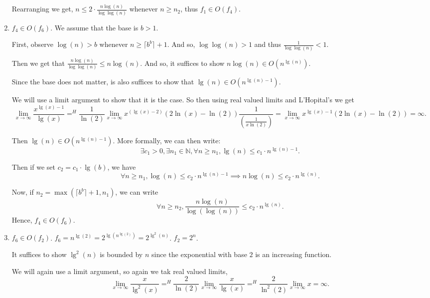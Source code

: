 \begin{soln}
\begin{enumerate}
		      Rearranging we get, \(n \leq 2 \cdot \frac{n\log(n)}{\log\log(n)}\) whenever \(n \geq n_2\), thus \(f_1 \in O(f_4)\).

		\item \(f_4 \in O(f_6)\). We assume that the base is \(b > 1\).

		      First, observe \(\log(n) > b\) whenever \(n \geq \lceil b^b \rceil + 1\). And so, \(\log\log(n) > 1\) and thus \(\frac{1}{\log\log(n)} < 1\).

		      Then we get that \(\frac{n\log(n)}{\log\log(n)} \leq n\log(n)\). And so, it suffices to show \(n\log(n) \in O(n^{\lg(n)})\).

		      Since the base does not matter, is also suffices to show that \(\lg(n) \in O(n^{\lg(n) - 1})\).

		      We will use a limit argument to show that it is the case. So then using real valued limits and L'Hopital's we get
		      \[
			      \lim_{x \to \infty} \frac{x^{\lg(x) - 1}}{\lg(x)} =^{H} \frac{1}{\ln(2)}\lim_{x \to \infty}x^{(\lg(x) - 2)}(2\ln(x) - \ln(2))\frac{1}{\left(\frac{1}{x\ln(2)}\right)} = \lim_{x \to \infty} x^{\lg(x) - 1}(2\ln(x) - \ln(2)) = \infty.
		      \]

		      Then \(\lg(n) \in O(n^{\lg(n) - 1})\). More formally, we can then write:
		      \[
			      \exists c_1 > 0, \exists n_1 \in \mathbb{N}, \forall n \geq n_1, \lg(n) \leq c_1 \cdot n^{\lg(n) - 1}.
		      \]

		      Then if we set \(c_2 = c_1 \cdot \lg(b)\), we have
		      \[
			      \forall n \geq n_1, \log(n) \leq c_2 \cdot n^{\lg(n) - 1} \implies n\log(n) \leq c_2 \cdot n^{\lg(n)}.
		      \]

		      Now, if \(n_2 = \max(\lceil b^b \rceil + 1, n_1)\), we can write
		      \[
			      \forall n \geq n_2, \frac{n\log(n)}{\log(\log(n))} \leq c_2 \cdot n^{\lg(n)}.
		      \]
		      Hence, \(f_4 \in O(f_6)\).

		\item \(f_6 \in O(f_2)\). \(f_6 = n^{\lg(2)} = 2^{\lg(n^{\lg(2)})} = 2^{\lg^2(n)}\). \(f_2 = 2^n\).

		      It suffices to show \(\lg^2(n)\) is bounded by \(n\) since the exponential with base \(2\) is an increasing function.

		      We will again use a limit argument, so again we tak real valued limits,
		      \[
			      \lim_{x \to \infty} \frac{x}{\lg^2(x)} =^{H} \frac{2}{\ln(2)}\lim_{x \to \infty}\frac{x}{\lg(x)} =^{H} \frac{2}{\ln^2(2)}\lim_{x \to \infty } x = \infty.
		      \]


\end{enumerate}
\end{soln}

